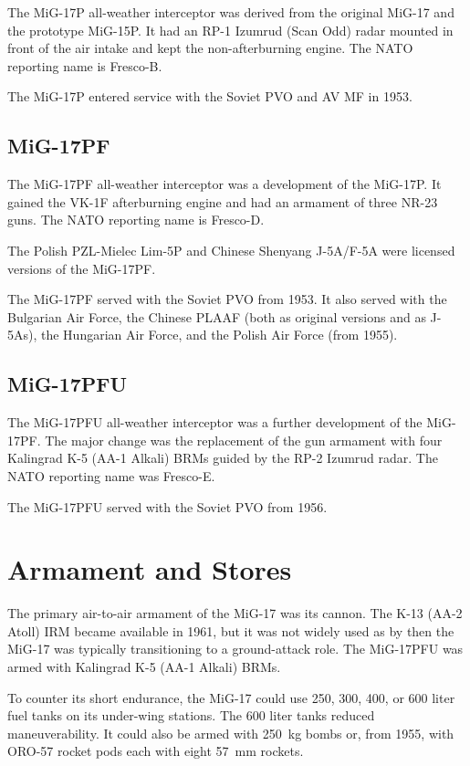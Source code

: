 The MiG-17P all-weather interceptor was derived from the original MiG-17 and the prototype MiG-15P. It had an RP-1 Izumrud (Scan Odd) radar mounted in front of the air intake and kept the non-afterburning engine. The NATO reporting name is Fresco-B.

The MiG-17P entered service with the Soviet PVO and AV MF in 1953.

\subsection{MiG-17PF}

The MiG-17PF all-weather interceptor was a development of the MiG-17P. It gained the VK-1F afterburning engine and had an armament of three NR-23 guns. The NATO reporting name is Fresco-D.

The Polish PZL-Mielec Lim-5P and Chinese Shenyang J-5A/F-5A were licensed versions of the MiG-17PF.

The MiG-17PF served with the Soviet PVO from 1953. It also served with the Bulgarian Air Force, the Chinese PLAAF (both as original versions and as J-5As), the Hungarian Air Force, and the Polish Air Force (from 1955).

\subsection{MiG-17PFU}

The MiG-17PFU all-weather interceptor was a further development of the MiG-17PF. The major change was the replacement of the gun armament with four Kalingrad K-5 (AA-1 Alkali) BRMs guided by the RP-2 Izumrud radar. The NATO reporting name was Fresco-E.

The MiG-17PFU served with the Soviet PVO from 1956.

\section{Armament and Stores}

The primary air-to-air armament of the MiG-17 was its cannon. The K-13 (AA-2 Atoll) IRM became available in 1961, but it was not widely used as by then the MiG-17 was typically transitioning to a ground-attack role. The MiG-17PFU was armed with Kalingrad K-5 (AA-1 Alkali) BRMs.

To counter its short endurance, the MiG-17 could use 250, 300, 400, or 600 liter fuel tanks on its under-wing stations. The 600 liter tanks reduced maneuverability. It could also be armed with 250~kg bombs or, from 1955, with ORO-57 rocket pods each with eight 57~mm rockets.

